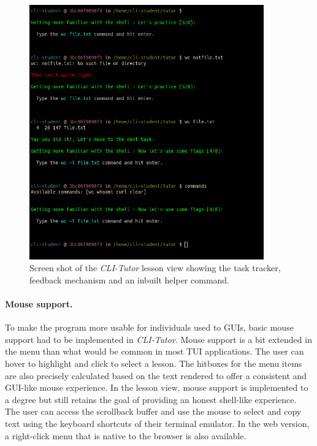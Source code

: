 \begin{figure}[htbp]
	\centering
	\includegraphics[width=0.9\textwidth]{img/lessonview}
	\caption{Screen shot of the \textit{CLI-Tutor} lesson view showing the task tracker, feedback mechanism and an inbuilt helper command.}
	\label{fig:lessonview}
\end{figure}


\paragraph{Mouse support.} To make the program more usable for
individuals used to GUIs, basic mouse support had to be implemented in
\textit{CLI-Tutor}. Mouse support is a bit extended in the menu than what would
be common in most TUI applications. The user can hover to highlight and click
to select a lesson. The hitboxes for the menu items are also precisely
calculated based on the text rendered to offer a consistent and GUI-like mouse
experience. In the lesson view, mouse support is implemented to a degree but
still retains the goal of providing an honest shell-like experience. The user
can access the scrollback buffer and use the mouse to select and copy text
using the keyboard shortcuts of their terminal emulator. In the web version, a
right-click menu that is native to the browser is also available.

